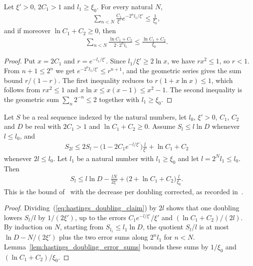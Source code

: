 \begin{lemma}
    \label{lem:hastings_doubling_error_sums}
    \leanok
    Let $\xi'>0$, $2C_1>1$ and $l_1\ge\xi_0$. For every natural $N$,
    \begin{align*}
        \sum_{n<N}\frac{C_1}{\xi'}e^{-2^nl_1/\xi'}\le\frac1{\xi_0},
    \end{align*}
    and if moreover $\ln C_1+C_2\ge0$, then
    \begin{align*}
        \sum_{n<N}\frac{\ln C_1+C_2}{2\cdot2^nl_1}
        \le\frac{\ln C_1+C_2}{\xi_0}.
    \end{align*}
\end{lemma}
\begin{proof}\leanok
    Put $x=2C_1$ and $r=e^{-l_1/\xi'}$. Since $l_1/\xi'\ge2\ln x$, we have
    $rx^2\le1$, so $r<1$. From $n+1\le2^n$ we get
    $e^{-2^nl_1/\xi'}\le r^{n+1}$, and the geometric series gives the sum
    bound $r/(1-r)$. The first inequality reduces to
    $r(1+x\ln x)\le1$, which follows from $rx^2\le1$ and
    $x\ln x\le x(x-1)\le x^2-1$. The second inequality is the geometric
    sum $\sum_{n}2^{-n}\le2$ together with $l_1\ge\xi_0$.
\end{proof}

\begin{lemma}
    \label{thm:hastings_doubling_iteration}
    \leanok
    Let $S$ be a real sequence indexed by the natural numbers, let $l_0$,
    $\xi'>0$, $C_1$, $C_2$ and $D$ be real with $2C_1>1$ and
    $\ln C_1+C_2\ge0$. Assume $S_l\le l\ln D$ whenever $l\le l_0$, and
    \begin{align}
        S_{2l}\le2S_l-\bigl(1-2C_1e^{-l/\xi'}\bigr)\frac{l}{\xi'}
        +\ln C_1+C_2
        \label{eq:hastings_doubling_claim}
    \end{align}
    whenever $2l\le l_0$. Let $l_1$ be a natural number with $l_1\ge\xi_0$
    and let $l=2^Nl_1\le l_0$. Then
    \begin{align*}
        S_l\le l\ln D-\frac{lN}{2\xi'}
        +\bigl(2+\ln C_1+C_2\bigr)\frac{l}{\xi_0}.
    \end{align*}
    This is the bound of~\cite[lines 221--224]{Hastings2007AreaLaw} with
    the decrease per doubling corrected, as recorded
    in~\cite{gap:hastings07_doubling_constants}.
\end{lemma}
\begin{proof}\leanok
    Dividing~(\ref{eq:hastings_doubling_claim}) by $2l$ shows that one
    doubling lowers $S_l/l$ by $1/(2\xi')$, up to the errors
    $C_1e^{-l/\xi'}/\xi'$ and $(\ln C_1+C_2)/(2l)$. By induction on $N$,
    starting from $S_{l_1}\le l_1\ln D$, the quotient $S_l/l$ is at most
    $\ln D-N/(2\xi')$ plus the two error sums along $2^nl_1$ for $n<N$.
    Lemma~\ref{lem:hastings_doubling_error_sums} bounds these sums by
    $1/\xi_0$ and $(\ln C_1+C_2)/\xi_0$.
\end{proof}

